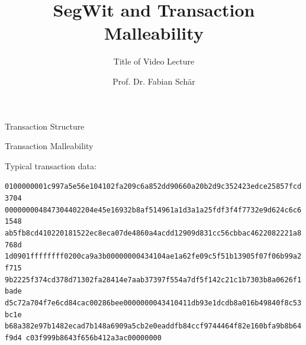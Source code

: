 \documentclass[]{beamer}
\title{SegWit and Transaction Malleability}
\subtitle{Title of Video Lecture}
\author{Prof. Dr. Fabian Schär}
\institute{University of Basel}
\begin{document}
\thispagestyle{empty}
\begin{frame}[noframenumbering]
	\titlepage
\end{frame}

\begin{frame}{Transaction Structure}

\begin{figure}
		
\end{figure}
\vspace{1em}


\end{frame}

\begin{frame}{Transaction Malleability}

Typical transaction data:\\
\begin{scriptsize}
	\texttt{\textcolor{black!30}{0100000001c997a5e56e104102fa209c6a852dd90660a20b2d9c352423edce25857fcd3704
		00000000}{\alert{4847304402204e45e16932b8af514961a1d3a1a25fdf3f4f7732e9d624c6c61548
		ab5fb8cd410220181522ec8eca07de4860a4acdd12909d831cc56cbbac4622082221a8768d
		1d0901}}\textcolor{black!30}{ffffffff0200ca9a3b00000000434104ae1a62fe09c5f51b13905f07f06b99a2f715
		9b2225f374cd378d71302fa28414e7aab37397f554a7df5f142c21c1b7303b8a0626f1bade
		d5c72a704f7e6cd84cac00286bee0000000043410411db93e1dcdb8a016b49840f8c53bc1e
		b68a382e97b1482ecad7b148a6909a5cb2e0eaddfb84ccf9744464f82e160bfa9b8b64f9d4
		c03f999b8643f656b412a3ac00000000}}
\end{scriptsize}
	\vspace{1em}
	
\end{frame}
\end{document}
